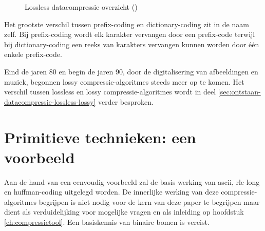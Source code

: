 \begin{figure}
	\caption{Lossless datacompressie overzicht (\cite{ethwcompressionhistory})}
	\label{fig:lossles-datacompressie-overzicht}
\end{figure}

Het grootste verschil tussen \gls{prefix-coding} en \gls{dictionary-coding} zit in de naam zelf. Bij \gls{prefix-coding} wordt elk karakter vervangen door een \gls{prefix-code} terwijl bij \gls{dictionary-coding} een reeks van karakters vervangen kunnen worden door één enkele \gls{prefix-code}.  

Eind de jaren 80 en begin de jaren 90, door de digitalisering van afbeeldingen en muziek, begonnen \gls{lossy} \glspl{compressie-algoritme} steeds meer op te komen. Het verschil tussen \gls{lossless} en \gls{lossy} \glspl{compressie-algoritme} wordt in deel \ref{sec:ontstaan-datacompressie-lossless-lossy} verder besproken.


\section{Primitieve technieken: een voorbeeld}
\label{sec:primitieve-technieken-voorbeeld}
Aan de hand van een eenvoudig voorbeeld zal de basis werking van \gls{ascii}, \gls{rle-long} en \gls{huffman-coding} uitgelegd worden. De innerlijke werking van deze \glspl{compressie-algoritme} begrijpen is niet nodig voor de kern van deze paper te begrijpen maar dient als verduidelijking voor mogelijke vragen en als inleiding op hoofdstuk \ref{ch:compressietool}. Een basiskennis van binaire bomen is vereist.

